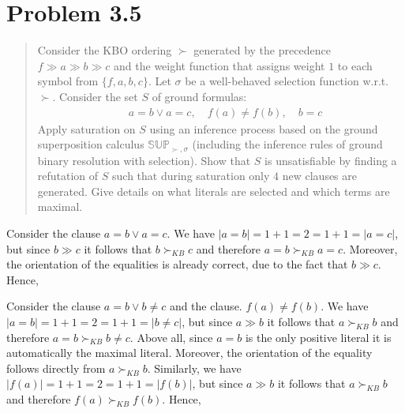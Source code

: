 \documentclass[11pt,a4paper]{article}
\begin{document}
\section*{Problem 3.5}
\begin{quote}
Consider the KBO ordering $\succ$ generated by the precedence $f \gg a \gg b \gg c$
and the weight function that assigns weight $1$ to each symbol from $\{f, a, b, c\}$. Let $\sigma$ be a well-behaved selection function w.r.t. $\succ$. Consider the set $S$ of ground formulas:
\begin{equation*}
\begin{split}
&a = b \lor a = c, \quad f (a) \neq f (b), \quad  b = c
\end{split}
\end{equation*}
Apply saturation on $S$ using an inference process based on the ground superposition calculus $\mathbb{SUP}_{\succ, \sigma}$
(including the inference rules of ground binary resolution with selection).
Show that $S$ is unsatisfiable by finding a refutation of $S$ such that during saturation only $4$ new clauses
are generated. Give details on what literals are selected and which terms are maximal.
\end{quote}

Consider the clause $a = b \lor a = c$. We have $|a = b|=1+1 = 2 = 1+1 = |a = c|$, but since $b \gg c$ it follows that $b \succ_{KB} c$ and therefore $a = b  \succ_{KB}  a = c$. Moreover, the orientation of the equalities is already correct, due to the fact that $b \gg c$. Hence, 

\begin{prooftree}
\end{prooftree}

Consider the clause $a=b \lor b \neq c$ and the clause. $f (a) \neq f (b)$. We have $|a = b|=1+1 = 2 = 1+1 = |b \neq c|$, but since $a \gg b$ it follows that $a \succ_{KB} b$ and therefore $a = b  \succ_{KB} b \neq c$. Above all, since $a=b$ is the only positive literal it is automatically the maximal literal. Moreover, the orientation of the equality follows directly from $a \succ_{KB} b$.
Similarly, we have  $|f(a)|=1+1 = 2 = 1+1 = |f(b)|$, but since $a \gg b$ it follows that $a \succ_{KB} b$ and therefore $f(a)  \succ_{KB} f(b)$. Hence, 

\begin{prooftree}
\end{prooftree}
\end{document}
